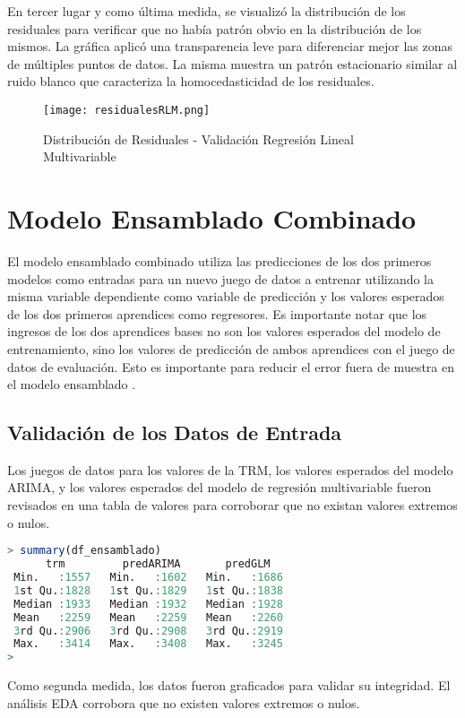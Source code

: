 En tercer lugar y como última medida, se visualizó la distribución de los residuales para verificar que no había patrón obvio en la distribución de los mismos. La gráfica aplicó una transparencia leve para diferenciar mejor las zonas de múltiples puntos de datos. La misma muestra un patrón estacionario similar al ruido blanco que caracteriza la homocedasticidad de los residuales. 

\begin{figure}[H]
    \centering
    \texttt{[image: residualesRLM.png]}
    \caption{Distribución de Residuales - Validación Regresión Lineal Multivariable}
\end{figure}   

\section{Modelo Ensamblado Combinado}
El modelo ensamblado combinado utiliza las predicciones de los dos primeros modelos como entradas para un nuevo juego de datos a entrenar utilizando la misma variable dependiente como variable de predicción y los valores esperados de los dos primeros aprendices como regresores. Es importante notar que los ingresos de los dos aprendices bases no son los valores esperados del modelo de entrenamiento, sino los valores de predicción de ambos aprendices con el juego de datos de evaluación. Esto es importante para reducir el error fuera de muestra en el modelo ensamblado \cite{leek}.

\subsection{Validación de los Datos de Entrada}
Los juegos de datos para los valores de la TRM, los valores esperados del modelo ARIMA, y los valores esperados del modelo de regresión multivariable fueron revisados en una tabla de valores para corroborar que no existan valores extremos o nulos.

\begin{lstlisting}[language=R]
> summary(df_ensamblado)
      trm         predARIMA       predGLM    
 Min.   :1557   Min.   :1602   Min.   :1686  
 1st Qu.:1828   1st Qu.:1829   1st Qu.:1838  
 Median :1933   Median :1932   Median :1928  
 Mean   :2259   Mean   :2259   Mean   :2260  
 3rd Qu.:2906   3rd Qu.:2908   3rd Qu.:2919  
 Max.   :3414   Max.   :3408   Max.   :3245  
>
\end{lstlisting}

Como segunda medida, los datos fueron graficados para validar su integridad. El análisis EDA corrobora que no existen valores extremos o nulos. 

